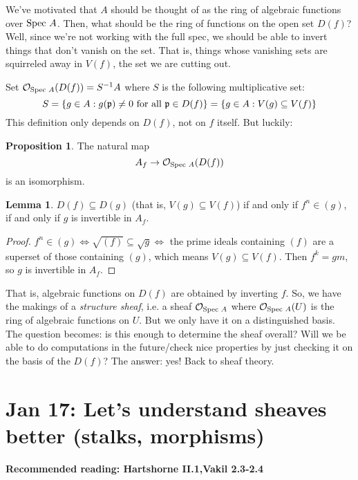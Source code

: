 \documentclass[10pt,reqno]{amsart}
\theoremstyle{definition}
\newtheorem{proposition}[theorem]{Proposition}
\newtheorem{lemma}[theorem]{Lemma}
\theoremstyle{remark}
\numberwithin{equation}{section}
\numberwithin{theorem}{section}
\newcommand{\OO}{{\mathcal O}}
\newcommand{\spec}{\textup{Spec }}
\newcommand{\pp}{\frak{p}}
\begin{document}
We've motivated that $A$ should be thought of as the ring of algebraic functions over $\spec A$. Then, what should be the ring of functions on the open set $D(f)$? Well, since we're not working with the full spec, we should be able to invert things that don't vanish on the set. That is, things whose vanishing sets are squirreled away in $V(f)$, the set we are cutting out.

Set $\OO_{\spec A}(D(f)) = S^{-1}A$ where $S$ is the following multiplicative set:
\[S = \{g \in A: g(\pp) \ne 0 \textup{ for all }\pp \in D(f)\} = \{g \in A: V(g) \subseteq V(f)\}\]
This definition only depends on $D(f)$, not on $f$ itself. But luckily:

\begin{proposition} The natural map
\[A_f \to \OO_{\spec A}(D(f))\]
is an isomorphism.
\end{proposition}

\begin{lemma}\label{lemma:restriction-well-def} $D(f) \subseteq D(g)$ (that is, $V(g) \subseteq V(f)$) if and only if $f^n \in (g)$, if and only if $g$ is invertible in $A_f$.
\end{lemma}
\begin{proof}
$f^n \in (g) \iff \sqrt{(f)} \subseteq \sqrt{g} \iff$ the prime ideals containing $(f)$ are a superset of those containing $(g)$, which means $V(g) \subseteq V(f)$. Then $f^k = gm$, so $g$ is invertible in $A_f$. 
\end{proof}

That is, algebraic functions on $D(f)$ are obtained by inverting $f$. So, we have the makings of a \textit{structure sheaf}, i.e. a sheaf $\OO_{\spec A}$ where $\OO_{\spec A}(U)$ is the ring of algebraic functions on $U$. But we only have it on a distinguished basis. The question becomes: is this enough to determine the sheaf overall? Will we be able to do computations in the future/check nice properties by just checking it on the basis of the $D(f)$? The answer: yes! Back to sheaf theory.
\section{Jan 17: Let's understand sheaves better (stalks, morphisms)}
\textbf{Recommended reading: Hartshorne II.1,Vakil 2.3-2.4}
\end{document}
